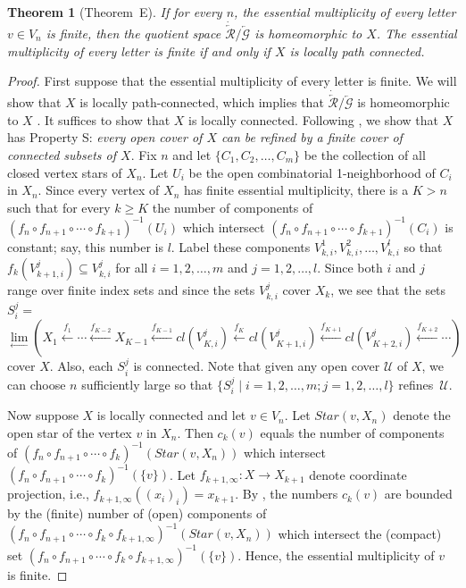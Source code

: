 \documentclass{amsart}
\newtheorem{theorem}{Theorem}[section]
\theoremstyle{definition}
\theoremstyle{remark}
\numberwithin{equation}{section}
\begin{document}
\begin{theorem}[Theorem~E]\label{lc}
 If for every $n$, the essential multiplicity of every letter $v\in V_n$ is finite, then the quotient space $\dot{\overleftarrow{\mathcal R}}/\overleftarrow{\mathcal G}$ is homeomorphic to $X$. The essential multiplicity of every letter is finite if and only if $X$ is locally path connected.
\end{theorem}

\begin{proof}
First suppose that the essential multiplicity of every letter is finite. We will show that $X$ is locally path-connected, which implies that  $\dot{\overleftarrow{\mathcal R}}/\overleftarrow{\mathcal G}$ is homeomorphic to $X$ \cite[Theorem~4.10(c)]{FZ2}. It suffices to show that $X$ is locally connected. Following \cite{GM}, we show that $X$ has Property S: {\em every open cover of $X$ can be refined by a finite cover of connected subsets of $X$}. Fix $n$ and let $\{C_1, C_2, \dots, C_m\}$ be the collection of all closed vertex stars of $X_n$. Let $U_i$ be the open combinatorial 1\nobreakdash-neighborhood of $C_i$ in $X_n$. Since every vertex of $X_n$ has finite  essential multiplicity, there is a $K>n$ such that for every $k\geqslant K$ the number of components of $(f_n\circ f_{n+1}\circ\cdots\circ f_{k+1})^{-1}(U_i)$ which intersect $(f_n\circ f_{n+1}\circ\cdots\circ f_{k+1})^{-1}(C_i)$ is constant; say, this number is $l$. Label these components $V_{k,i}^1, V_{k,i}^2, \dots, V_{k,i}^l$ so that $f_k(V_{k+1,i}^j)\subseteq V_{k,i}^j$ for all $i=1,2,\dots, m$ and $j=1, 2, \dots, l$. Since both $i$ and $j$ range over finite index sets and since the sets $V_{k,i}^j$ cover $X_k$, we see that the sets
$S_i^j=$\[\lim_{\longleftarrow}\left(X_1 \stackrel{f_1}{\longleftarrow}  \cdots \stackrel{f_{K-2}}{\longleftarrow} X_{K-1} \stackrel{f_{K-1}}{\longleftarrow}  cl(V_{K,i}^j)\stackrel{f_K}{\longleftarrow} cl(V_{K+1,i}^j) \stackrel{f_{K+1}}{\longleftarrow} cl(V_{K+2,i}^j) \stackrel{f_{K+2}}{\longleftarrow} \cdots\right)\]  cover $X$. Also, each $S_i^j$ is connected.
  Note that given any open cover $\mathcal U$ of $X$, we can choose $n$ sufficiently large so that $\{S_i^j\mid i=1,2,\dots, m; j=1, 2, \dots, l\}$ refines~$\mathcal U$.

Now suppose $X$ is locally connected and let  $v\in V_n$.
Let $Star(v,X_n)$ denote the open star of the vertex $v$ in $X_n$. Then $c_k(v)$ equals the number of components of $(f_n\circ f_{n+1}\circ \cdots\circ f_{k})^{-1}(Star(v,X_n))$ which intersect $(f_n\circ f_{n+1}\circ \cdots\circ f_{k})^{-1}(\{v\})$.
  Let $f_{k+1,\infty}:X\rightarrow X_{k+1}$ denote coordinate projection, i.e., $f_{k+1,\infty}((x_i)_i)=x_{k+1}$.\linebreak
    By \cite[Lemma~2]{GM}, the numbers $c_k(v)$ are bounded by the (finite) number of (open) components of $(f_n\circ f_{n+1}\circ \cdots\circ f_{k}\circ f_{k+1,\infty})^{-1}(Star(v,X_n))$ which intersect the (compact) set $(f_n\circ f_{n+1}\circ \cdots\circ f_k\circ f_{k+1,\infty})^{-1}(\{v\})$. Hence, the essential multiplicity of $v$ is finite.
\end{proof}
\end{document}

